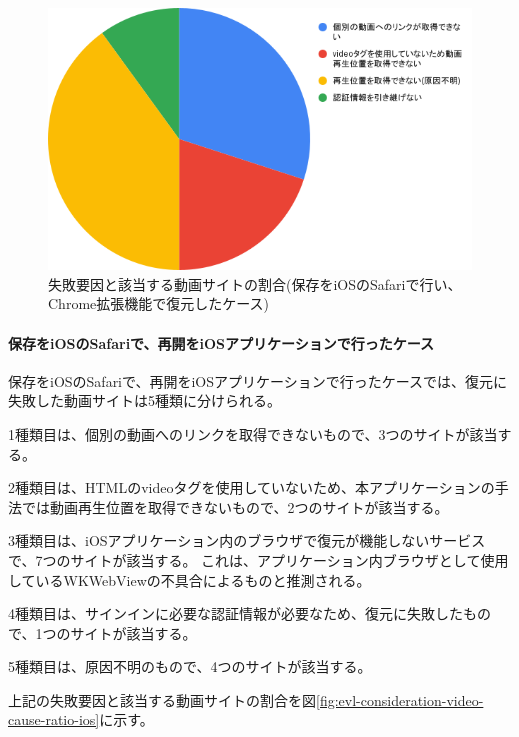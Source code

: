 \begin{figure}[htbp]
  \label{fig:evl-consideration-video-cause-ratio-ios-chrome}
  \begin{center}
    \includegraphics[bb=0 0 600 371,width=15cm]{img/060_evaluation/consideration/video/cause-ratio-ios-chrome.pdf}
  \end{center}
  \caption{失敗要因と該当する動画サイトの割合(保存をiOSのSafariで行い、Chrome拡張機能で復元したケース)}
\end{figure}

\paragraph{保存をiOSのSafariで、再開をiOSアプリケーションで行ったケース}
保存をiOSのSafariで、再開をiOSアプリケーションで行ったケースでは、復元に失敗した動画サイトは5種類に分けられる。

1種類目は、個別の動画へのリンクを取得できないもので、3つのサイトが該当する。

2種類目は、HTMLのvideoタグを使用していないため、本アプリケーションの手法では動画再生位置を取得できないもので、2つのサイトが該当する。

3種類目は、iOSアプリケーション内のブラウザで復元が機能しないサービスで、7つのサイトが該当する。
これは、アプリケーション内ブラウザとして使用しているWKWebViewの不具合によるものと推測される。

4種類目は、サインインに必要な認証情報が必要なため、復元に失敗したもので、1つのサイトが該当する。

5種類目は、原因不明のもので、4つのサイトが該当する。

上記の失敗要因と該当する動画サイトの割合を図\ref{fig:evl-consideration-video-cause-ratio-ios}に示す。


